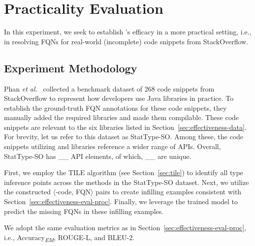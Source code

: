 \section{Practicality Evaluation}
\label{sec:eval}

In this experiment, we seek to establish \tool's efficacy in a more practical setting, i.e., in resolving FQNs for real-world (incomplete) code snippets from StackOverflow.

\subsection{Experiment Methodology}
Phan {\em et al.}~\cite{icse18} collected a benchmark dataset of 268 code snippets from StackOverflow to represent how developers use Java libraries in practice. To establish the ground-truth FQN annotations for these code snippets, they manually added the required libraries and made them compilable. These code snippets are relevant to the six libraries listed in Section~\ref{sec:effectiveness-data}. For brevity, let us refer to this dataset as StatType-SO. Among these, the code snippets utilizing  and  libraries reference a wider range of APIs. 
Overall, StatType-SO has \_\_ API elements, of which, \_\_ are unique.

First, we employ the TILE algorithm (see Section~\ref{sec:tile}) to identify all type inference points across the methods in the StatType-SO dataset. Next, we utilize the constructed $\langle$\blank-code, FQN$\rangle$ pairs to create infilling examples consistent with Section~\ref{sec:effectiveness-eval-proc}. Finally, we leverage the trained \tool model to predict the missing FQNs in these infilling examples.


We adopt the same evaluation metrics as in Section~\ref{sec:effectiveness-eval-proc}, i.e., Accuracy\textsubscript{\textit{EM}}, ROUGE-L, and BLEU-2.

